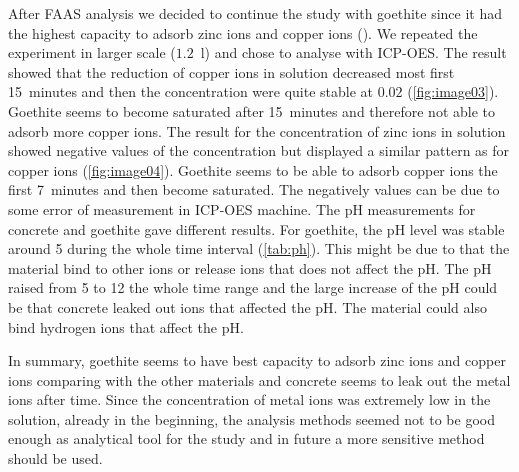 After FAAS analysis we decided to continue the study with goethite since it had the highest capacity to adsorb zinc ions and copper ions (). We repeated the experiment in larger scale ($1.2$~l) and chose to analyse with ICP-OES. The result showed that the reduction of copper ions in solution decreased most first 15~minutes and then the concentration were quite stable at $0.02$ (\cref{fig:image03}). Goethite seems to become saturated after 15~minutes and therefore not able to adsorb more copper ions. The result for the concentration of zinc ions in solution showed negative values of the concentration but displayed a similar pattern as for copper ions (\cref{fig:image04}). Goethite seems to be able to adsorb copper ions the first 7~minutes and then become saturated. The negatively values can be due to some error of measurement in ICP-OES machine. 
The pH measurements for concrete and goethite gave different results. For goethite, the pH level was stable around 5 during the whole time interval (\cref{tab:ph}). This might be due to that the material bind to other ions or release ions that does not affect the pH. The pH raised from 5 to 12 the whole time range and the large increase of the pH could be that concrete leaked out ions that affected the pH. The material could also bind hydrogen ions that affect the pH. 

In summary, goethite seems to have best capacity to adsorb zinc ions and copper ions comparing with the other materials and concrete seems to leak out the metal ions after time. Since the concentration of metal ions was extremely low in the solution, already in the beginning, the analysis methods seemed not to be good enough as analytical tool for the study and in future a more sensitive method should be used. 
